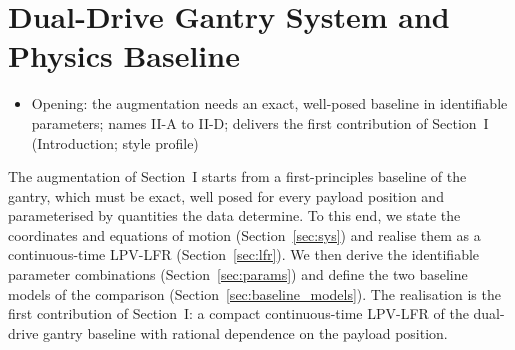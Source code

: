 \section{Dual-Drive Gantry System and Physics Baseline}\label{sec:baseline}
\ifdraft
\begin{itemize}
\item Opening: the augmentation needs an exact, well-posed baseline in identifiable parameters; names II-A to II-D; delivers the first contribution of Section~I (Introduction; style profile)
\end{itemize}
\fi

The augmentation of Section~I starts from a first-principles baseline of the
gantry, which must be exact, well posed for every payload position and
parameterised by quantities the data determine.
To this end, we state the coordinates and equations of motion
(Section~\ref{sec:sys}) and realise them as a continuous-time LPV-LFR
(Section~\ref{sec:lfr}).
We then derive the identifiable parameter combinations
(Section~\ref{sec:params}) and define the two baseline models of the
comparison (Section~\ref{sec:baseline_models}).
The realisation is the first contribution of Section~I: a compact
continuous-time LPV-LFR of the dual-drive gantry baseline with rational
dependence on the payload position.

